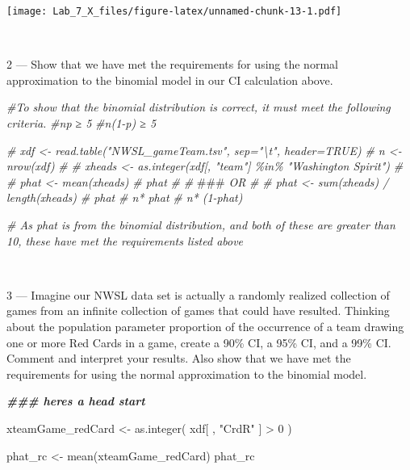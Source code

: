 \documentclass[
]{article}
\newenvironment{Shaded}{\begin{snugshade}}{\end{snugshade}}
\newcommand{\AlertTok}[1]{\textcolor[rgb]{0.94,0.16,0.16}{#1}}
\newcommand{\CommentTok}[1]{\textcolor[rgb]{0.56,0.35,0.01}{\textit{#1}}}
\newcommand{\DecValTok}[1]{\textcolor[rgb]{0.00,0.00,0.81}{#1}}
\newcommand{\DocumentationTok}[1]{\textcolor[rgb]{0.56,0.35,0.01}{\textbf{\textit{#1}}}}
\newcommand{\FunctionTok}[1]{\textcolor[rgb]{0.00,0.00,0.00}{#1}}
\newcommand{\NormalTok}[1]{#1}
\newcommand{\OtherTok}[1]{\textcolor[rgb]{0.56,0.35,0.01}{#1}}
\newcommand{\SpecialCharTok}[1]{\textcolor[rgb]{0.00,0.00,0.00}{#1}}
\newcommand{\StringTok}[1]{\textcolor[rgb]{0.31,0.60,0.02}{#1}}
\begin{document}
\texttt{[image: Lab\_7\_X\_files/figure-latex/unnamed-chunk-13-1.pdf]}

~

2 --- Show that we have met the requirements for using the normal
approximation to the binomial model in our CI calculation above.

\begin{Shaded}
\begin{Highlighting}[]
\CommentTok{\#To show that the binomial distribution is correct, it must meet the following criteria. }
\CommentTok{\#np ≥ 5}
\CommentTok{\#n(1{-}p) ≥ 5}

\CommentTok{\# xdf \textless{}{-} read.table("NWSL\_gameTeam.tsv", sep="\textbackslash{}t", header=TRUE)}
\CommentTok{\# n \textless{}{-} nrow(xdf)}
\CommentTok{\# }
\CommentTok{\# xheads \textless{}{-} as.integer(xdf[, "team"] \%in\% "Washington Spirit")}
\CommentTok{\# }
\CommentTok{\# phat \textless{}{-} mean(xheads)}
\CommentTok{\# phat}
\CommentTok{\# }
\CommentTok{\# }\AlertTok{\#\#\#}\CommentTok{ OR}
\CommentTok{\# }
\CommentTok{\# phat \textless{}{-} sum(xheads) / length(xheads)}
\CommentTok{\# phat}
\CommentTok{\# n* phat}
\CommentTok{\# n* (1{-}phat)}

\CommentTok{\# As phat is from the binomial distribution, and both of these are greater than 10, these have met the requirements listed above}
\end{Highlighting}
\end{Shaded}

~

3 --- Imagine our NWSL data set is actually a randomly realized
collection of games from an infinite collection of games that could have
resulted. Thinking about the population parameter proportion of the
occurrence of a team drawing one or more Red Cards in a game, create a
90\% CI, a 95\% CI, and a 99\% CI. Comment and interpret your results.
Also show that we have met the requirements for using the normal
approximation to the binomial model.

\begin{Shaded}
\begin{Highlighting}[]
\DocumentationTok{\#\#\# here\textquotesingle{}s a head start}

\NormalTok{xteamGame\_redCard }\OtherTok{\textless{}{-}} \FunctionTok{as.integer}\NormalTok{( xdf[ , }\StringTok{"CrdR"}\NormalTok{ ] }\SpecialCharTok{\textgreater{}} \DecValTok{0}\NormalTok{ )}

\NormalTok{phat\_rc }\OtherTok{\textless{}{-}} \FunctionTok{mean}\NormalTok{(xteamGame\_redCard)}
\NormalTok{phat\_rc}
\end{Highlighting}
\end{Shaded}
\end{document}
